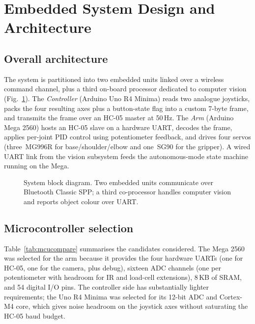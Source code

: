 \section{Embedded System Design and Architecture}
\label{sec:design}

\subsection{Overall architecture}
The system is partitioned into two embedded units linked over a
wireless command channel, plus a third on-board processor dedicated
to computer vision (Fig.~\ref{fig:blockdiagram}). The
\emph{Controller} (Arduino Uno R4 Minima) reads two analogue
joysticks, packs the four resulting axes plus a button-state flag
into a custom 7-byte frame, and transmits the frame over an HC-05
master at 50\,Hz. The \emph{Arm} (Arduino Mega 2560) hosts an HC-05
slave on a hardware UART, decodes the frame, applies per-joint PID
control using potentiometer feedback, and drives four servos
(three~MG996R for base/shoulder/elbow and one~SG90 for the gripper).
A wired UART link from the vision subsystem feeds the autonomous-mode
state machine running on the Mega.

\begin{figure}[t]
  \centering
  \caption{System block diagram. Two embedded units communicate over
  Bluetooth Classic SPP; a third co-processor handles computer vision
  and reports object colour over UART.}
  \label{fig:blockdiagram}
\end{figure}

\subsection{Microcontroller selection}
Table~\ref{tab:mcucompare} summarises the candidates considered. The
Mega 2560 was selected for the arm because it provides the four
hardware UARTs (one for HC-05, one for the camera, plus debug),
sixteen ADC channels (one per potentiometer with headroom for IR and
load-cell extensions), 8\,KB of SRAM, and 54 digital I/O pins. The
controller side has substantially lighter requirements; the Uno R4
Minima was selected for its 12-bit ADC and Cortex-M4 core, which
gives noise headroom on the joystick axes without saturating the
HC-05 baud budget.

